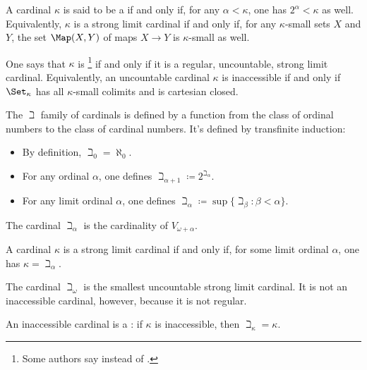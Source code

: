 \begin{definition}
	A cardinal $\kappa$ is said to be a  if and only if, for any $\alpha<\kappa$, one has $2^\alpha<\kappa$ as well.
	Equivalently, $ \kappa $ is a strong limit cardinal if and only if, for any $ \kappa $-small sets $ X $ and $ Y $, the set $ \Map(X, Y) $ of maps $ X \to Y $ is $ \kappa $-small as well. 

	One says that $\kappa$ is %
	\footnote{Some authors say  instead of .}
	if and only if it is a regular, uncountable, strong limit cardinal.
	Equivalently, an uncountable cardinal $ \kappa $ is inaccessible if and only if $ \Set_{\kappa} $ has all $ \kappa $-small colimits and is cartesian closed.
\end{definition}

\begin{eg}
	The $\beth$ family of cardinals is defined by a function from the class of ordinal numbers to the class of cardinal numbers.
	It's defined by transfinite induction:
	\begin{itemize}
		\item By definition, $ \beth_0 = \aleph_0 $.
		\item For any ordinal $ \alpha $, one defines $ \beth_{\alpha+1} \coloneq 2^{\beth_{\alpha}} $.
		\item For any limit ordinal $ \alpha $, one defines $ \beth_{\alpha} \coloneq \sup \{ \beth_{\beta} : \beta < \alpha \} $.
	\end{itemize}
	The cardinal $ \beth_{\alpha} $ is the cardinality of $ V_{\omega+\alpha} $.

	A cardinal $ \kappa $ is a strong limit cardinal if and only if, for some limit ordinal $ \alpha $, one has $ \kappa = \beth_{\alpha} $.

	The cardinal $ \beth_{\omega} $ is the smallest uncountable strong limit cardinal.
	It is not an inaccessible cardinal, however, because it is not regular.

	An inaccessible cardinal is a :
	if $ \kappa $ is inaccessible, then $ \beth_{\kappa} = \kappa $.
\end{eg}

